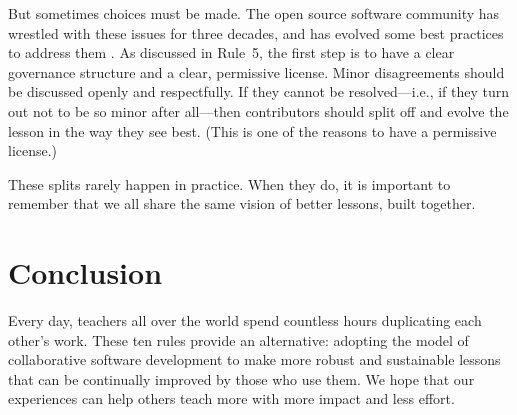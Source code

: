 \documentclass[10pt,letterpaper]{article}
\begin{document}
But sometimes choices must be made.
The open source software community has wrestled with these issues for three decades,
and has evolved some best practices to address them
\cite{producing-oss}.
As discussed in Rule~5,
the first step is to have a clear governance structure and a clear, permissive license.
Minor disagreements should be discussed openly and respectfully.
If they cannot be resolved---i.e., if they turn out not to be so minor after all---then
contributors should split off and evolve the lesson in the way they see best.
(This is one of the reasons to have a permissive license.)

These splits rarely happen in practice.
When they do,
it is important to remember that we all share the same vision of better lessons, built together.

\section*{Conclusion}

Every day,
teachers all over the world spend countless hours duplicating each other's work.
These ten rules provide an alternative:
adopting the model of collaborative software development
to make more robust and sustainable lessons
that can be continually improved by those who use them.
We hope that our experiences can help others teach more
with more impact and less effort.

\nolinenumbers

%
%
\end{document}
